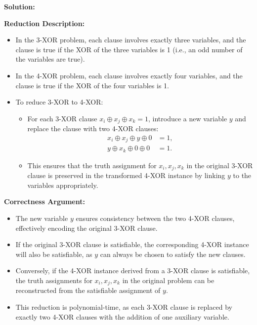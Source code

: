 \documentclass[11pt]{article}
\newenvironment{solution}{%
    \par\noindent\textbf{Solution:}\par%
}{\par}
\begin{document}
\begin{solution}
\textbf{Reduction Description:}
\begin{itemize}
    \item In the 3-XOR problem, each clause involves exactly three variables, and the clause is true if the XOR of the three variables is 1 (i.e., an odd number of the variables are true).
    \item In the 4-XOR problem, each clause involves exactly four variables, and the clause is true if the XOR of the four variables is 1.
    \item To reduce 3-XOR to 4-XOR:
    \begin{itemize}
        \item For each 3-XOR clause \( x_i \oplus x_j \oplus x_k = 1 \), introduce a new variable \( y \) and replace the clause with two 4-XOR clauses:
        \begin{align*}
            x_i \oplus x_j \oplus y \oplus 0 &= 1, \\
            y \oplus x_k \oplus 0 \oplus 0 &= 1.
        \end{align*}
        \item This ensures that the truth assignment for \( x_i, x_j, x_k \) in the original 3-XOR clause is preserved in the transformed 4-XOR instance by linking \( y \) to the variables appropriately.
    \end{itemize}
\end{itemize}

\textbf{Correctness Argument:}
\begin{itemize}
    \item The new variable \( y \) ensures consistency between the two 4-XOR clauses, effectively encoding the original 3-XOR clause.
    \item If the original 3-XOR clause is satisfiable, the corresponding 4-XOR instance will also be satisfiable, as \( y \) can always be chosen to satisfy the new clauses.
    \item Conversely, if the 4-XOR instance derived from a 3-XOR clause is satisfiable, the truth assignments for \( x_i, x_j, x_k \) in the original problem can be reconstructed from the satisfiable assignment of \( y \).
    \item This reduction is polynomial-time, as each 3-XOR clause is replaced by exactly two 4-XOR clauses with the addition of one auxiliary variable.
\end{itemize}
\end{solution}
\end{document}
